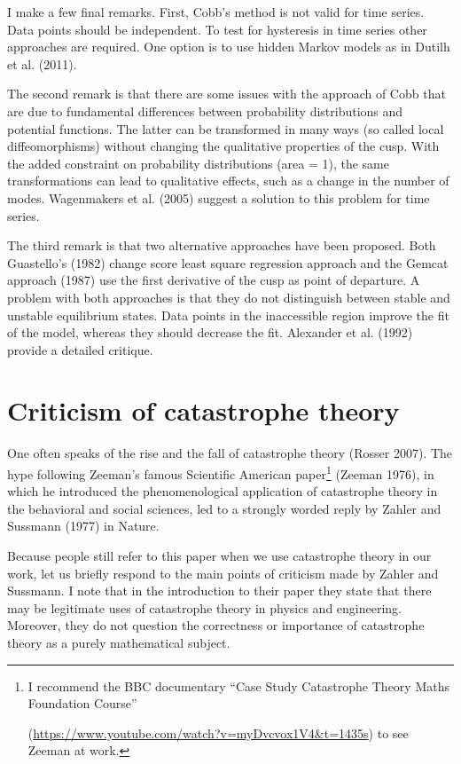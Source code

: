 \documentclass[
  a4paper,
  DIV=11,
  numbers=noendperiod,
  oneside]{scrreprt}
\begin{document}
I make a few final remarks. First, Cobb's method is not valid for time
series. Data points should be independent. To test for hysteresis in
time series other approaches are required. One option is to use hidden
Markov models as in Dutilh et al. (2011).

The second remark is that there are some issues with the approach of
Cobb that are due to fundamental differences between probability
distributions and potential functions. The latter can be transformed in
many ways (so called local diffeomorphisms) without changing the
qualitative properties of the cusp. With the added constraint on
probability distributions (area = 1), the same transformations can lead
to qualitative effects, such as a change in the number of modes.
Wagenmakers et al. (2005) suggest a solution to this problem for time
series.

The third remark is that two alternative approaches have been proposed.
Both Guastello's (1982) change score least square regression approach
and the Gemcat approach (1987) use the first derivative of the cusp as
point of departure. A problem with both approaches is that they do not
distinguish between stable and unstable equilibrium states. Data points
in the inaccessible region improve the fit of the model, whereas they
should decrease the fit. Alexander et al. (1992) provide a detailed
critique.

\hypertarget{sec-Criticism-of-catastrophe-theory}{%
\section{Criticism of catastrophe
theory}\label{sec-Criticism-of-catastrophe-theory}}

One often speaks of the rise and the fall of catastrophe theory (Rosser
2007). The hype following Zeeman's famous Scientific American
paper\footnote{I recommend the BBC documentary ``Case Study Catastrophe
  Theory Maths Foundation Course''

  (\url{https://www.youtube.com/watch?v=myDvcvox1V4\&t=1435s}) to see
  Zeeman at work.} (Zeeman 1976), in which he introduced the
phenomenological application of catastrophe theory in the behavioral and
social sciences, led to a strongly worded reply by Zahler and Sussmann
(1977) in Nature.

Because people still refer to this paper when we use catastrophe theory
in our work, let us briefly respond to the main points of criticism made
by Zahler and Sussmann. I note that in the introduction to their paper
they state that there may be legitimate uses of catastrophe theory in
physics and engineering. Moreover, they do not question the correctness
or importance of catastrophe theory as a purely mathematical subject.
\end{document}
